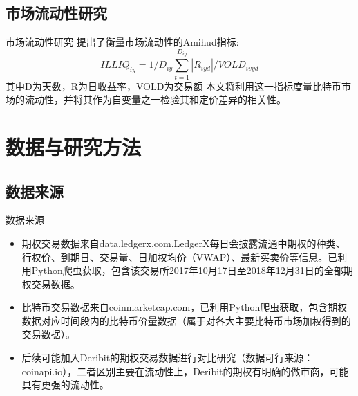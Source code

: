 \documentclass[11pt,dark]{mathbeamer}
\begin{document}
\subsection{市场流动性研究}
\begin{frame}{市场流动性研究}
   提出了衡量市场流动性的Amihud指标:
  \begin{equation*}
    ILLIQ_{iy}=1/D_{iy}\sum^{D_{iy}}_{t=1}|R_{iyd}|/VOLD_{ivyd}
  \end{equation*}
  其中D为天数，R为日收益率，VOLD为交易额\newline
  本文将利用这一指标度量比特币市场的流动性，并将其作为自变量之一检验其和定价差异的相关性。
\end{frame}
\section{数据与研究方法}
\subsection{数据来源}
\begin{frame}{数据来源}
  \begin{itemize}
    \item 期权交易数据来自data.ledgerx.com.LedgerX每日会披露流通中期权的种类、行权价、到期日、交易量、日加权均价（VWAP）、最新买卖价等信息。已利用Python爬虫获取，包含该交易所2017年10月17日至2018年12月31日的全部期权交易数据。
    \item 比特币交易数据来自coinmarketcap.com，已利用Python爬虫获取，包含期权数据对应时间段内的比特币价量数据（属于对各大主要比特币市场加权得到的交易数据）。
    \item 后续可能加入Deribit的期权交易数据进行对比研究（数据可行来源：coinapi.io），二者区别主要在流动性上，Deribit的期权有明确的做市商，可能具有更强的流动性。
  \end{itemize}
\end{frame}
\end{document}
